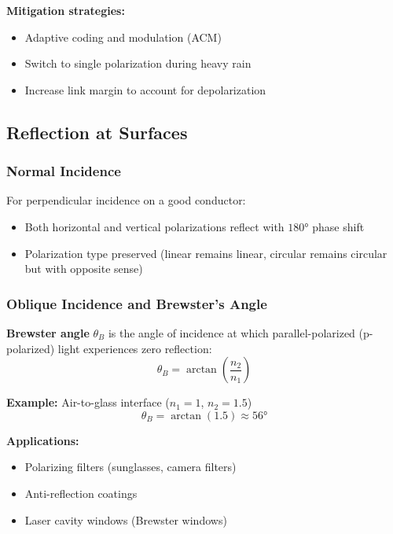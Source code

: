 \textbf{Mitigation strategies:}
\begin{itemize}
\item Adaptive coding and modulation (ACM)
\item Switch to single polarization during heavy rain
\item Increase link margin to account for depolarization
\end{itemize}

\subsection{Reflection at Surfaces}

\subsubsection{Normal Incidence}

For perpendicular incidence on a good conductor:
\begin{itemize}
\item Both horizontal and vertical polarizations reflect with $180°$ phase shift
\item Polarization type preserved (linear remains linear, circular remains circular but with opposite sense)
\end{itemize}

\subsubsection{Oblique Incidence and Brewster's Angle}

\textbf{Brewster angle} $\theta_B$ is the angle of incidence at which parallel-polarized (p-polarized) light experiences zero reflection:
\begin{equation}
\theta_B = \arctan\left(\frac{n_2}{n_1}\right)
\label{eq:brewster-angle}
\end{equation}

\textbf{Example:} Air-to-glass interface ($n_1 = 1$, $n_2 = 1.5$)
\begin{equation}
\theta_B = \arctan(1.5) \approx 56°
\label{eq:brewster-example}
\end{equation}

\textbf{Applications:}
\begin{itemize}
\item Polarizing filters (sunglasses, camera filters)
\item Anti-reflection coatings
\item Laser cavity windows (Brewster windows)
\end{itemize}

